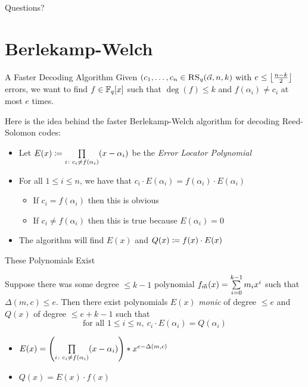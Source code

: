 \documentclass[aspectratio=169]{beamer}
\begin{document}
\begin{frame}{}
      \begin{center}
    {\color{sigma@mainblue} \LARGE Questions?}
  \end{center}
\end{frame}

\section{Berlekamp-Welch}
\frame{\sectionpage}

\begin{frame}{A Faster Decoding Algorithm}
    Given $(c_1, \ldots, c_n \in \textsc{RS}_q(\vec{\alpha} ,n, k)$ with $e \leq \left\lfloor \frac{n - k}{2} \right\rfloor$ errors, we want to find $f \in \mathbb{F}_q[x]$ such that $\deg(f) \leq k$ and $f(\alpha_i) \neq c_i$ at most $e$ times.\pause
    
    Here is the idea behind the faster Berlekamp-Welch algorithm for decoding Reed-Solomon codes:
    \begin{itemize}
        \item Let $E(x) \coloneqq \prod\limits_{i\colon c_i \neq f(\alpha_i)}(x - \alpha_i)$ be the \emph{Error Locator Polynomial} \pause
        \item For all $1 \leq i \leq n$, we have that $c_i \cdot E(\alpha_i) = f(\alpha_i) \cdot E(\alpha_i)$
        \begin{itemize}
            \item If $c_i = f(\alpha_i)$ then this is obvious
            \item If $c_i \neq f(\alpha_i)$ then this is true because \pause $E(\alpha_i) = 0$
        \end{itemize} \pause
        \item The algorithm will find $E(x)$ and $Q(x) \coloneqq f(x) \cdot E(x)$
    \end{itemize}
\end{frame}

\begin{frame}{These Polynomials Exist}
    \begin{lem}
        Suppose there was some degree $\leq k - 1$ polynomial $f_{\vec{m}}(x) = \sum\limits_{i = 0}^{k - 1} m_i x^i$ such that $\Delta(m, c) \leq e$.
        Then there exist polynomials $E(x)$ \emph{monic} of degree $\leq e$ and $Q(x)$ of degree $\leq e + k - 1$ such that
        \[
            \text{for all } 1 \leq i \leq n,~c_i \cdot E(\alpha_i) = Q(\alpha_i)
        \]
    \end{lem}\pause
    \begin{itemize}
        \item $E(x) = \pqty{\Prod_{i\colon c_i \neq f(\alpha_i)}(x - \alpha_i)} * x^{e - \Delta(m, c)}$
        \item $Q(x) = E(x) \cdot f(x)$
    \end{itemize}
\end{frame}
\end{document}
